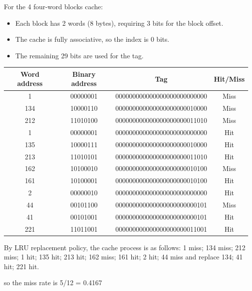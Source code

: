 \documentclass[cn,12pt]{homework}
\begin{document}
\begin{solution}

For the 4 four-word blocks cache:
\begin{itemize}
    \item Each block has 2 words (8 bytes), requiring 3 bits for the block offset.
    \item The cache is fully associative, so the index is 0 bits.
    \item The remaining 29 bits are used for the tag.
\end{itemize}

\begin{center}
\begin{tabular}{|c|c|c|c|}
\hline
Word address & Binary address & Tag  & Hit/Miss \\
\hline
1   & 00000001        & 000000000000000000000000000      & Miss \\
134 & 10000110        & 000000000000000000000010000      & Miss \\
212 & 11010100        & 000000000000000000000011010      & Miss \\
1   & 00000001        & 000000000000000000000000000      & Hit  \\
135 & 10000111        & 000000000000000000000010000      & Hit \\
213 & 11010101        & 000000000000000000000011010      & Hit  \\
162 & 10100010        & 000000000000000000000010100      & Miss \\
161 & 10100001        & 000000000000000000000010100      & Hit  \\
2   & 00000010        & 000000000000000000000000000      & Hit \\
44  & 00101100        & 000000000000000000000000101      & Miss \\
41  & 00101001        & 000000000000000000000000101      & Hit  \\
221 & 11011001        & 000000000000000000000011001      & Hit \\
\hline
\end{tabular}
\end{center}

By LRU replacement policy, the cache process is as follows:
1 miss; 
134 miss;
212 miss;
1 hit;
135 hit;
213 hit;
162 miss;
161 hit;
2 hit;
44 miss and replace 134;
41 hit;
221 hit.

so the miss rate is 5/12 = 0.4167

\end{solution}
\end{document}
